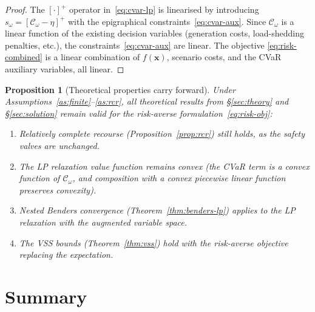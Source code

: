 \documentclass[11pt]{article}
\newtheorem{proposition}{Proposition}
\begin{document}
\begin{proof}
The $[\cdot]^+$ operator in~\eqref{eq:cvar-lp} is linearised
by introducing $s_\omega = [\mathcal{C}_\omega - \eta]^+$ with
the epigraphical constraints~\eqref{eq:cvar-aux}. Since
$\mathcal{C}_\omega$ is a linear function of the existing decision
variables (generation costs, load-shedding penalties, etc.), the
constraints~\eqref{eq:cvar-aux} are linear. The objective
\eqref{eq:risk-combined} is a linear combination of $f(\mathbf{x})$,
scenario costs, and the CVaR auxiliary variables, all linear.
\end{proof}

\begin{proposition}[Theoretical properties carry forward]
\label{prop:cvar-props}
Under Assumptions~\ref{as:finite}--\ref{as:rcr}, all theoretical
results from \S\ref{sec:theory} and \S\ref{sec:solution} remain
valid for the risk-averse formulation~\eqref{eq:risk-obj}:
\begin{enumerate}[nosep]
  \item Relatively complete recourse (Proposition~\ref{prop:rcr})
    still holds, as the safety valves are unchanged.
  \item The LP relaxation value function remains convex (the
    CVaR term is a convex function of $\mathcal{C}_\omega$, and
    composition with a convex piecewise linear function preserves
    convexity).
  \item Nested Benders convergence
    (Theorem~\ref{thm:benders-lp}) applies to the LP relaxation
    with the augmented variable space.
  \item The VSS bounds (Theorem~\ref{thm:vss}) hold with the
    risk-averse objective replacing the expectation.
\end{enumerate}
\end{proposition}

\section{Summary}\label{sec:summary}
\end{document}
